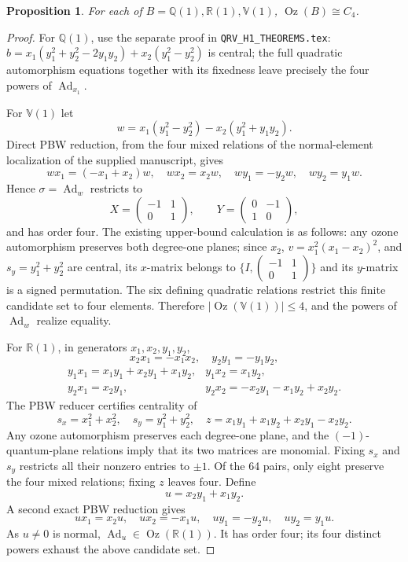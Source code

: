 \documentclass[11pt]{amsart}
\newtheorem{proposition}{Proposition}
\DeclareMathOperator{\Oz}{Oz}
\DeclareMathOperator{\Ad}{Ad}
\begin{document}
\begin{proposition}
For each of $B=\mathbb Q(1),\mathbb R(1),\mathbb V(1)$,
$\Oz(B)\cong C_4$.
\end{proposition}
\begin{proof}
For $\mathbb Q(1)$, use the separate proof in \texttt{QRV\_H1\_THEOREMS.tex}:
$b=x_1(y_1^2+y_2^2-2y_1y_2)+x_2(y_1^2-y_2^2)$ is central;
the full quadratic automorphism equations together with its fixedness leave
precisely the four powers of $\Ad_{x_1}$.

For $\mathbb V(1)$ let
\[
 w=x_1(y_1^2-y_2^2)-x_2(y_1^2+y_1y_2).
\]
Direct PBW reduction, from the four mixed relations of the normal-element
localization of the supplied manuscript, gives
\[
 w x_1=(-x_1+x_2)w,\quad w x_2=x_2w,\quad
 w y_1=-y_2w,\quad w y_2=y_1w.
\]
Hence $\sigma=\Ad_w$ restricts to
\[
 X=\begin{pmatrix}-1&1\\0&1\end{pmatrix},\qquad
 Y=\begin{pmatrix}0&-1\\1&0\end{pmatrix},
\]
and has order four. The existing upper-bound calculation is as follows:
any ozone automorphism preserves both degree-one planes; since $x_2$,
$v=x_1^2(x_1-x_2)^2$, and $s_y=y_1^2+y_2^2$ are central,
its $x$-matrix belongs to
$\{I,\left(\begin{smallmatrix}-1&1\\0&1\end{smallmatrix}\right)\}$
and its $y$-matrix is a signed permutation. The six defining quadratic
relations restrict this finite candidate set to four elements. Therefore
$|\Oz(\mathbb V(1))|\le4$, and the powers of $\Ad_w$ realize equality.

For $\mathbb R(1)$, in generators $x_1,x_2,y_1,y_2$,
\[
 x_2x_1=-x_1x_2,\quad y_2y_1=-y_1y_2,
\]
\[
\begin{array}{ll}
 y_1x_1=x_1y_1+x_2y_1+x_1y_2,& y_1x_2=x_1y_2,\\
 y_2x_1=x_2y_1,&y_2x_2=-x_2y_1-x_1y_2+x_2y_2.
\end{array}
\]
The PBW reducer certifies centrality of
\[
 s_x=x_1^2+x_2^2,\quad s_y=y_1^2+y_2^2,\quad
 z=x_1y_1+x_1y_2+x_2y_1-x_2y_2.
\]
Any ozone automorphism preserves each degree-one plane, and the
$(-1)$-quantum-plane relations imply that its two matrices are monomial.
Fixing $s_x$ and $s_y$ restricts all their nonzero entries to $\pm1$.
Of the 64 pairs, only eight preserve the four mixed relations; fixing $z$
leaves four. Define
\[
 u=x_2y_1+x_1y_2.
\]
A second exact PBW reduction gives
\[
 u x_1=x_2u,\quad u x_2=-x_1u,\quad
 u y_1=-y_2u,\quad u y_2=y_1u.
\]
As $u\ne0$ is normal, $\Ad_u\in\Oz(\mathbb R(1))$. It has order four;
its four distinct powers exhaust the above candidate set.
\end{proof}
\end{document}
